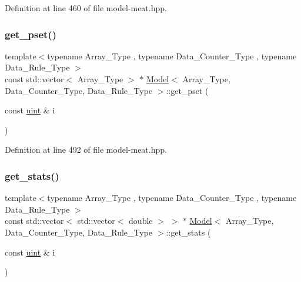 Definition at line 460 of file model-\/meat.\+hpp.

\mbox{\label{class_model_ad09221a8938765deec2c9d4d0fa8dec5}} 
\subsubsection{\texorpdfstring{get\+\_\+pset()}{get\_pset()}}
{\footnotesize\ttfamily template$<$typename Array\+\_\+\+Type , typename Data\+\_\+\+Counter\+\_\+\+Type , typename Data\+\_\+\+Rule\+\_\+\+Type $>$ \\
const std\+::vector$<$ Array\+\_\+\+Type $>$ $\ast$ \hyperlink{class_model}{Model}$<$ Array\+\_\+\+Type, Data\+\_\+\+Counter\+\_\+\+Type, Data\+\_\+\+Rule\+\_\+\+Type $>$\+::get\+\_\+pset (\begin{DoxyParamCaption}\item[{const \hyperlink{typedefs_8hpp_a91ad9478d81a7aaf2593e8d9c3d06a14}{uint} \&}]{i }\end{DoxyParamCaption})\hspace{0.3cm}{\ttfamily [inline]}}



Definition at line 492 of file model-\/meat.\+hpp.

\mbox{\label{class_model_adde1cf74eb0ca7f771b7878af9766cdf}} 
\subsubsection{\texorpdfstring{get\+\_\+stats()}{get\_stats()}}
{\footnotesize\ttfamily template$<$typename Array\+\_\+\+Type , typename Data\+\_\+\+Counter\+\_\+\+Type , typename Data\+\_\+\+Rule\+\_\+\+Type $>$ \\
const std\+::vector$<$ std\+::vector$<$ double $>$ $>$ $\ast$ \hyperlink{class_model}{Model}$<$ Array\+\_\+\+Type, Data\+\_\+\+Counter\+\_\+\+Type, Data\+\_\+\+Rule\+\_\+\+Type $>$\+::get\+\_\+stats (\begin{DoxyParamCaption}\item[{const \hyperlink{typedefs_8hpp_a91ad9478d81a7aaf2593e8d9c3d06a14}{uint} \&}]{i }\end{DoxyParamCaption})\hspace{0.3cm}{\ttfamily [inline]}}



